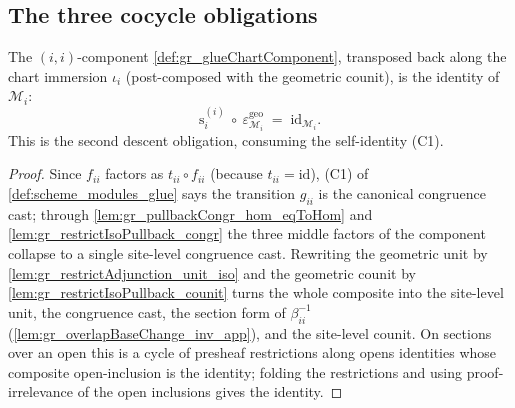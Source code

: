 \subsection{The three cocycle obligations}

\begin{lemma}
  \label{lem:gr_glueChartComponent_self_counit}
  The \((i,i)\)-component \cref{def:gr_glueChartComponent}, transposed back along the
  chart immersion \(\iota_i\) (post-composed with the geometric counit), is the
  identity of \(\mathcal{M}_i\):
  \[
    \mathrm{s}_i^{(i)}\ \circ\ \varepsilon^{\mathrm{geo}}_{\mathcal{M}_i}
      \;=\; \mathrm{id}_{\mathcal{M}_i}.
  \]
  This is the second descent obligation, consuming the self-identity (C1).
\end{lemma}
\begin{proof}
    \leanok
  Since \(f_{ii}\) factors as \(t_{ii}\circ f_{ii}\) (because \(t_{ii} = \mathrm{id}\)),
  (C1) of \cref{def:scheme_modules_glue} says the transition \(g_{ii}\) is the
  canonical congruence cast; through \cref{lem:gr_pullbackCongr_hom_eqToHom} and
  \cref{lem:gr_restrictIsoPullback_congr} the three middle factors of the component
  collapse to a single site-level congruence cast. Rewriting the geometric unit by
  \cref{lem:gr_restrictAdjunction_unit_iso} and the geometric counit by
  \cref{lem:gr_restrictIsoPullback_counit} turns the whole composite into the
  site-level unit, the congruence cast, the section form of \(\beta_{ii}^{-1}\)
  (\cref{lem:gr_overlapBaseChange_inv_app}), and the site-level counit. On sections
  over an open this is a cycle of presheaf restrictions along opens identities whose
  composite open-inclusion is the identity; folding the restrictions and using
  proof-irrelevance of the open inclusions gives the identity.
\end{proof}

